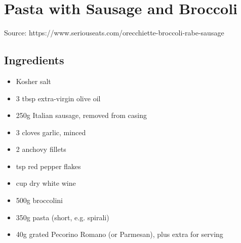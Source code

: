 \section{Pasta with Sausage and Broccoli}
  Source: https://www.seriouseats.com/orecchiette-broccoli-rabe-sausage
    \subsection{Ingredients}
      \begin{itemize}
        \item Kosher salt
        \item 3 tbsp extra-virgin olive oil
        \item 250g Italian sausage, removed from casing
        \item 3 cloves garlic, minced
        \item 2 anchovy fillets
        \item {} tsp red pepper flakes
        \item {} cup dry white wine
        \item 500g broccolini
        \item 350g pasta (short, e.g. spirali)
        \item 40g grated Pecorino Romano (or Parmesan), plus extra for serving
      \end{itemize}
